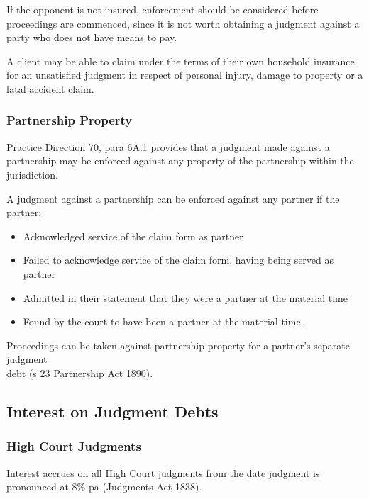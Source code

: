 \documentclass[
]{article}
\providecommand{\tightlist}{%
  \setlength{\itemsep}{0pt}\setlength{\parskip}{0pt}}
\begin{document}
If the opponent is not insured, enforcement should be considered before
proceedings are commenced, since it is not worth obtaining a judgment
against a party who does not have means to pay.

A client may be able to claim under the terms of their own household
insurance for an unsatisfied judgment in respect of personal injury,
damage to property or a fatal accident claim.

\hypertarget{partnership-property}{%
\subsubsection{Partnership Property}\label{partnership-property}}

Practice Direction 70, para 6A.1 provides that a judgment made against a
partnership may be enforced against any property of the partnership
within the jurisdiction.

A judgment against a partnership can be enforced against any partner if
the partner:

\begin{itemize}
\tightlist
\item
  Acknowledged service of the claim form as partner
\item
  Failed to acknowledge service of the claim form, having being served
  as partner
\item
  Admitted in their statement that they were a partner at the material
  time
\item
  Found by the court to have been a partner at the material time.
\end{itemize}

Proceedings can be taken against partnership property for a partner's
separate judgment\\
debt (s 23 Partnership Act 1890).

\hypertarget{interest-on-judgment-debts}{%
\subsection{Interest on Judgment
Debts}\label{interest-on-judgment-debts}}

\hypertarget{high-court-judgments}{%
\subsubsection{High Court Judgments}\label{high-court-judgments}}

Interest accrues on all High Court judgments from the date judgment is
pronounced at 8\% pa (Judgments Act 1838).
\end{document}
